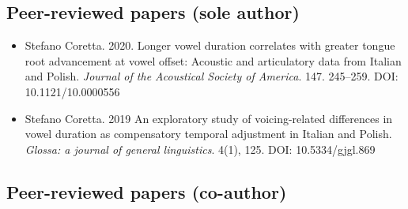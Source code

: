 \documentclass{article}
\begin{document}
\subsection{Peer-reviewed papers (sole author)}

\begin{itemize}
\item Stefano Coretta. 2020. Longer vowel duration correlates with greater tongue root advancement at vowel offset: Acoustic and articulatory data from Italian and Polish. \textit{Journal of the Acoustical Society of America}. 147. 245--259. DOI: 10.1121/10.0000556

\item Stefano Coretta. 2019 An exploratory study of voicing-related differences in vowel duration as compensatory temporal adjustment in Italian and Polish. \textit{Glossa: a journal of general linguistics}. 4(1), 125. DOI: 10.5334/gjgl.869
\end{itemize}

\subsection{Peer-reviewed papers (co-author)}
\end{document}
